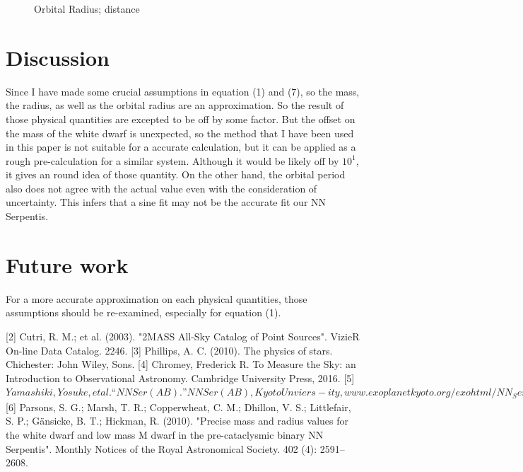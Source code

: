 \documentclass[10pt,journal,compsoc]{IEEEtran}
\begin{document}
\begin{figure}
\centering
\caption{Orbital Radius; distance}
\end{figure}




\section{Discussion}
Since I have made some crucial assumptions in equation (1) and (7), so the mass, the radius, as well as the orbital radius are an approximation. So the result of those physical quantities are excepted to be off by some factor. But the offset on the mass of the white dwarf is unexpected, so the method that I have been used in this paper is not suitable for a accurate calculation, but it can be applied as a rough pre-calculation for a similar system. Although it would be likely off by $10^{1}$, it gives an round idea of those quantity.  
On the other hand, the orbital period also does not agree with the actual value even with the consideration of uncertainty. This infers that a sine fit may not be the accurate fit our NN Serpentis.

\section{Future work}
For a more accurate approximation on each physical quantities, those assumptions should be re-examined, especially for equation (1).


\cite{lamport1994latex}
\footnotesize[2] Cutri, R. M.; et al. (2003). "2MASS All-Sky Catalog of Point Sources". VizieR On-line Data Catalog. 2246. 
\footnotesize[3] Phillips, A. C. (2010). The physics of stars. Chichester: John Wiley, Sons.
\footnotesize[4] Chromey, Frederick R. To Measure the Sky: an Introduction to Observational Astronomy. Cambridge University Press, 2016.
\footnotesize[5] $Yamashiki, Yosuke, et al. “NN Ser (AB).” NN Ser (AB), Kyoto Unviers-
ity, www.exoplanetkyoto.org/exohtml/NN_Ser_(AB).html.$
\footnotesize[6] Parsons, S. G.; Marsh, T. R.; Copperwheat, C. M.; Dhillon, V. S.; Littlefair, S. P.; Gänsicke, B. T.; Hickman, R. (2010). "Precise mass and radius values for the white dwarf and low mass M dwarf in the pre-cataclysmic binary NN Serpentis". Monthly Notices of the Royal Astronomical Society. 402 (4): 2591–2608.

\end{document}
